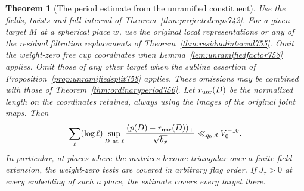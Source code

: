 \documentclass[a4paper,11pt]{article}
\newtheorem{theorem}[proposition]{Theorem}
\theoremstyle{definition}
\theoremstyle{remark}
\numberwithin{equation}{section}
\begin{document}
\begin{theorem}[The period estimate from the unramified constituent]
\leavevmode\label{thm:unramifiedperiod758}
Use the fields, twists and full interval of
Theorem~\ref{thm:projectedcups742}. For a given target \(M\)
at a spherical place \(w\), use the original local representations
or any of the residual filtration replacements of
Theorem~\ref{thm:residualinterval755}. Omit the weight-zero free
cup coordinates when Lemma~\ref{lem:unramifiedfactor758} applies.
Omit those of any other target when the subline assertion of
Proposition~\ref{prop:unramifiedsplit758} applies. These omissions
may be combined with those of Theorem~\ref{thm:ordinaryperiod756}.
Let \(r_{\rm unr}(D)\) be the normalized length on the coordinates
retained, always using the images of the original joint maps.
Then
\[
 \sum_\ell(\log\ell)\sup_{D\ {\rm at}\ \ell}
       \frac{(p(D)-r_{\rm unr}(D))_+}{\sqrt{b_x}}
                                            \ll_{q_0,d}V_0^{-10}.
\]
In particular, at places where the matrices become triangular
over a finite field extension, the weight-zero tests are covered
in arbitrary flag order. If \(J_\tau>0\) at every embedding
of such a place, the estimate covers every target there.
\end{theorem}
\end{document}
